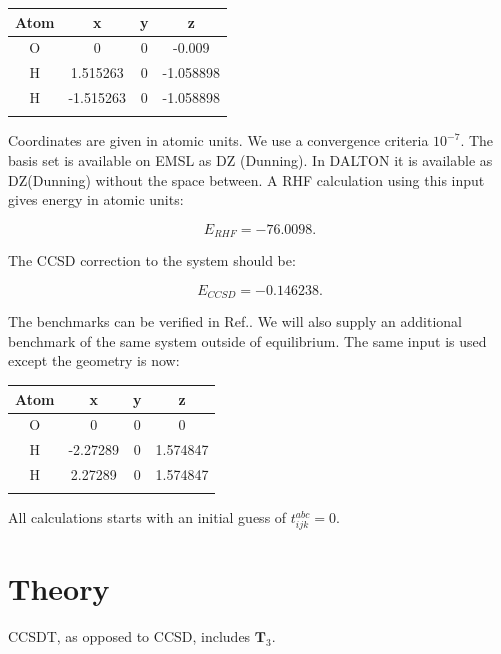 \documentclass[a4paper,norsk,11pt,twoside]{report}
\begin{document}
\begin{center}
  \begin{tabular}{ c c c c }
  \hline
     Atom & x & y & z \\ \hline
     O & 0 & 0 & -0.009 \\
     H & 1.515263 & 0 & -1.058898 \\
     H & -1.515263 & 0 & -1.058898 \\
     \hline \\
  \end{tabular} 
\end{center} 

Coordinates are given in atomic units. We use a convergence criteria $10^{-7}$. The basis set is available on EMSL as DZ (Dunning). In DALTON it is available as DZ(Dunning) without the space between. A RHF calculation using this input gives energy in atomic units:

\begin{equation}
E_{RHF} = -76.0098 .
\end{equation}

The CCSD correction to the system should be:

\begin{equation}
E_{CCSD} = -0.146238 .
\end{equation}

The benchmarks can be verified in Ref.\cite{CCSDT-ref3}. We will also supply an additional benchmark of the same system outside of equilibrium. The same input is used except the geometry is now: \\

\begin{center}
  \begin{tabular}{ c c c c }
  \hline
     Atom & x & y & z \\ \hline
     O & 0 & 0 & 0 \\
     H & -2.27289   & 0 & 1.574847 \\
     H & 2.27289 & 0 & 1.574847 \\
     \hline \\
  \end{tabular} 
\end{center} 

All calculations starts with an initial guess of $t_{ijk}^{abc} = 0$.

\section{Theory}
CCSDT, as opposed to CCSD, includes $\textbf{T}_3$. 
\end{document}
